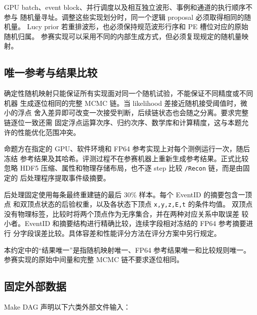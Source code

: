 \documentclass[UTF8,a4paper,11pt]{ctexart}
\begin{document}
GPU batch、event block、并行调度以及相互独立波形、事例和通道的执行顺序不参与
随机量寻址。调整这些实现划分时，同一个逻辑 proposal 必须取得相同的随机量。
Lucy prior 若重排波形，也必须保持规范波形行序和 PE 槽位对应的原始随机归属。
参赛实现可以采用不同的内部生成方式，但必须复现规定的随机量映射。

\subsection{唯一参考与结果比较}

确定性随机映射只能保证所有实现面对同一个随机试验，不能保证不同精度或不同机器
生成逐位相同的完整 MCMC 链。当 likelihood 差接近随机接受阈值时，微小的浮点
舍入差异即可改变一次接受判断，后续链状态也会随之分离。要求完整链逐位一致还需
固定浮点运算次序、归约次序、数学库和计算精度，这与本题允许的性能优化范围冲突。

命题方在指定的 GPU、软件环境和 FP64 参考实现上对每个测例运行一次，随后冻结
参考结果及其哈希。评测过程不在参赛机器上重新生成参考结果。正式比较忽略 HDF5
压缩、属性和物理存储布局，也不逐 step 比较 \texttt{/Recon} 链，而是由固定的
后处理程序提取事件级摘要。

后处理固定使用每条最终重建链的最后 30\% 样本。每个 EventID 的摘要包含一顶点
和双顶点状态的后验权重，以及各状态下顶点 \texttt{x,y,z,E,t} 的条件均值。
双顶点没有物理标签，比较时将两个顶点作为无序集合，并在两种对应关系中取误差
较小者。EventID 和摘要结构进行精确比较，连续字段相对冻结的 FP64 参考摘要进行
分字段误差比较。具体容差和性能评分方法在评分方案中另行规定。

本约定中的“结果唯一”是指随机映射唯一、FP64 参考结果唯一和比较规则唯一。
参赛实现的原始中间量和完整 MCMC 链不要求逐位相同。

\subsection{固定外部数据}

Make DAG 声明以下六类外部文件输入：
\end{document}
